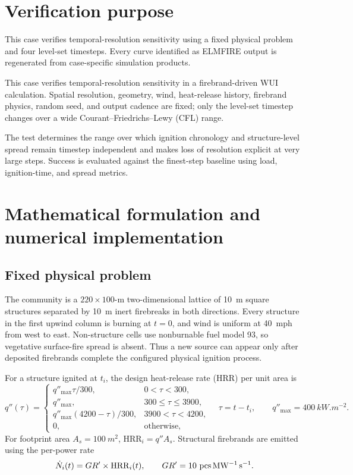\section{Verification purpose}

This case verifies temporal-resolution sensitivity using a fixed physical
problem and four level-set timesteps. Every curve identified as ELMFIRE output
is regenerated from case-specific simulation products.

This case verifies temporal-resolution sensitivity in a firebrand-driven WUI calculation. Spatial resolution, geometry, wind, heat-release history, firebrand physics, random seed, and output cadence are fixed; only the level-set timestep changes over a wide Courant--Friedrichs--Lewy (CFL) range.

The test determines the range over which ignition chronology and structure-level spread remain timestep independent and makes loss of resolution explicit at very large steps. Success is evaluated against the finest-step baseline using load, ignition-time, and spread metrics.

\section{Mathematical formulation and numerical implementation}

\subsection{Fixed physical problem}

The community is a \(220\times100\)-m two-dimensional lattice of
\SI{10}{m} square structures separated by \SI{10}{m} inert firebreaks in both
directions. Every structure in the first upwind column is burning at \(t=0\), and wind is uniform at
\SI{40}{mph} from west to east. Non-structure cells use nonburnable fuel model
93, so vegetative surface-fire spread is absent. Thus a
new source can appear only after deposited firebrands complete the configured
physical ignition process.

For a structure ignited at \(t_i\), the design heat-release rate (HRR) per unit area is
\[
q''(\tau)=
\begin{cases}
q''_{\max}\tau/300,&0<\tau<300,\\
q''_{\max},&300\le\tau\le3900,\\
q''_{\max}(4200-\tau)/300,&3900<\tau<4200,\\
0,&\text{otherwise},
\end{cases}
\quad \tau=t-t_i,\qquad q''_{\max}=\SI{400}{kW.m^{-2}}.
\]
For footprint area \(A_s=\SI{100}{m^2}\),
\(\mathrm{HRR}_i=q''A_s\). Structural firebrands are emitted using the per-power rate
\[
\dot N_i(t)=GR'\times{\mathrm{HRR}_i(t)},\qquad
GR'=\SI{10}\,\rm{pcs\, MW^{-1}\,s^{-1}}.
\]

